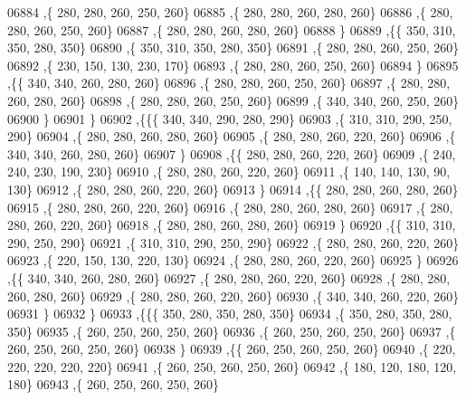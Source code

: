 \begin{DoxyCode}
06884     ,\{   280,   280,   260,   250,   260\}
06885     ,\{   280,   280,   260,   280,   260\}
06886     ,\{   280,   280,   260,   250,   260\}
06887     ,\{   280,   280,   260,   280,   260\}
06888     \}
06889    ,\{\{   350,   310,   350,   280,   350\}
06890     ,\{   350,   310,   350,   280,   350\}
06891     ,\{   280,   280,   260,   250,   260\}
06892     ,\{   230,   150,   130,   230,   170\}
06893     ,\{   280,   280,   260,   250,   260\}
06894     \}
06895    ,\{\{   340,   340,   260,   280,   260\}
06896     ,\{   280,   280,   260,   250,   260\}
06897     ,\{   280,   280,   260,   280,   260\}
06898     ,\{   280,   280,   260,   250,   260\}
06899     ,\{   340,   340,   260,   250,   260\}
06900     \}
06901    \}
06902   ,\{\{\{   340,   340,   290,   280,   290\}
06903     ,\{   310,   310,   290,   250,   290\}
06904     ,\{   280,   280,   260,   280,   260\}
06905     ,\{   280,   280,   260,   220,   260\}
06906     ,\{   340,   340,   260,   280,   260\}
06907     \}
06908    ,\{\{   280,   280,   260,   220,   260\}
06909     ,\{   240,   240,   230,   190,   230\}
06910     ,\{   280,   280,   260,   220,   260\}
06911     ,\{   140,   140,   130,    90,   130\}
06912     ,\{   280,   280,   260,   220,   260\}
06913     \}
06914    ,\{\{   280,   280,   260,   280,   260\}
06915     ,\{   280,   280,   260,   220,   260\}
06916     ,\{   280,   280,   260,   280,   260\}
06917     ,\{   280,   280,   260,   220,   260\}
06918     ,\{   280,   280,   260,   280,   260\}
06919     \}
06920    ,\{\{   310,   310,   290,   250,   290\}
06921     ,\{   310,   310,   290,   250,   290\}
06922     ,\{   280,   280,   260,   220,   260\}
06923     ,\{   220,   150,   130,   220,   130\}
06924     ,\{   280,   280,   260,   220,   260\}
06925     \}
06926    ,\{\{   340,   340,   260,   280,   260\}
06927     ,\{   280,   280,   260,   220,   260\}
06928     ,\{   280,   280,   260,   280,   260\}
06929     ,\{   280,   280,   260,   220,   260\}
06930     ,\{   340,   340,   260,   220,   260\}
06931     \}
06932    \}
06933   ,\{\{\{   350,   280,   350,   280,   350\}
06934     ,\{   350,   280,   350,   280,   350\}
06935     ,\{   260,   250,   260,   250,   260\}
06936     ,\{   260,   250,   260,   250,   260\}
06937     ,\{   260,   250,   260,   250,   260\}
06938     \}
06939    ,\{\{   260,   250,   260,   250,   260\}
06940     ,\{   220,   220,   220,   220,   220\}
06941     ,\{   260,   250,   260,   250,   260\}
06942     ,\{   180,   120,   180,   120,   180\}
06943     ,\{   260,   250,   260,   250,   260\}

\end{DoxyCode}
